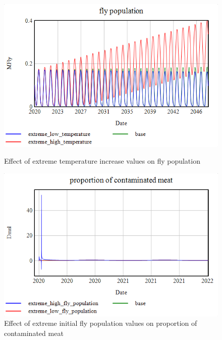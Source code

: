 \begin{figure}[h!]
    \centering
    \begin{minipage}{0.45\textwidth}
        \centering
        \includegraphics[width=\textwidth]{images/extremes/Temperature_fly_population.png} 
        \caption{Effect of extreme temperature increase values on fly population}
        \label{fig:temp_fly}
    \end{minipage}
    \begin{minipage}{0.45\textwidth}
        \centering
        \includegraphics[width=\textwidth]{images/extremes/Fly_population_contaminated_meat.png} 
        \caption{Effect of extreme initial fly population values on proportion of contaminated meat}
        \label{fig:fly_meat}
    \end{minipage}
\end{figure}


